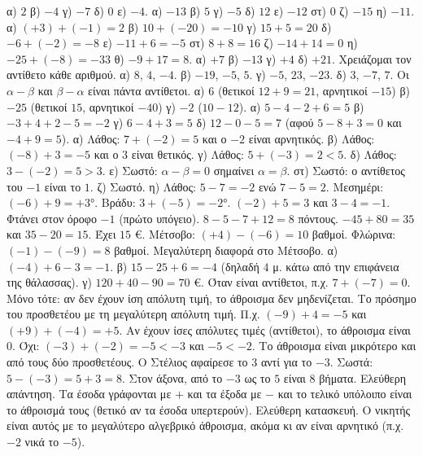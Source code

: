  α) $2$ \quad β) $-4$ \quad γ) $-7$ \quad δ) $0$ \quad ε) $-4$.
 α) $-13$ \quad β) $5$ \quad γ) $-5$ \quad δ) $12$ \quad ε) $-12$ \quad στ) $0$ \quad ζ) $-15$ \quad η) $-11$.
 α) $(+3)+(-1)=2$ \quad β) $10+(-20)=-10$ \quad γ) $15+5=20$ \quad δ) $-6+(-2)=-8$ \quad ε) $-11+6=-5$ \quad στ) $8+8=16$ \quad ζ) $-14+14=0$ \quad η) $-25+(-8)=-33$ \quad θ) $-9+17=8$.
 α) $+7$ \quad β) $-13$ \quad γ) $+4$ \quad δ) $+21$. Χρειάζομαι τον αντίθετο κάθε αριθμού.
 α) $8$, $4$, $-4$. β) $-19$, $-5$, $5$. γ) $-5$, $23$, $-23$. δ) $3$, $-7$, $7$. Οι $\alpha-\beta$ και $\beta-\alpha$ είναι πάντα αντίθετοι.
 α) $6$ (θετικοί $12+9=21$, αρνητικοί $-15$) \quad β) $-25$ (θετικοί $15$, αρνητικοί $-40$) \quad γ) $-2$ ($10-12$).
 α) $5-4-2+6=5$ \quad β) $-3+4+2-5=-2$ \quad γ) $6-4+3=5$ \quad δ) $12-0-5=7$ (αφού $5-8+3=0$ και $-4+9=5$).
 α) Λάθος: $7+(-2)=5$ και ο $-2$ είναι αρνητικός. β) Λάθος: $(-8)+3=-5$ και ο $3$ είναι θετικός. γ) Λάθος: $5+(-3)=2<5$. δ) Λάθος: $3-(-2)=5>3$. ε) Σωστό: $\alpha-\beta=0$ σημαίνει $\alpha=\beta$. στ) Σωστό: ο αντίθετος του $-1$ είναι το $1$. ζ) Σωστό. η) Λάθος: $5-7=-2$ ενώ $7-5=2$.
 Μεσημέρι: $(-6)+9=+3$°. Βράδυ: $3+(-5)=-2$°.
 $(-2)+5=3$ και $3-4=-1$. Φτάνει στον όροφο $-1$ (πρώτο υπόγειο).
 $8-5-7+12=8$ πόντους.
 $-45+80=35$ και $35-20=15$. Έχει $15$ €.
 Μέτσοβο: $(+4)-(-6)=10$ βαθμοί. Φλώρινα: $(-1)-(-9)=8$ βαθμοί. Μεγαλύτερη διαφορά στο Μέτσοβο.
 α) $(-4)+6-3=-1$. β) $15-25+6=-4$ (δηλαδή $4$ μ. κάτω από την επιφάνεια της θάλασσας). γ) $120+40-90=70$ €.
 Όταν είναι αντίθετοι, π.χ. $7+(-7)=0$. Μόνο τότε: αν δεν έχουν ίση απόλυτη τιμή, το άθροισμα δεν μηδενίζεται.
 Το πρόσημο του προσθετέου με τη μεγαλύτερη απόλυτη τιμή. Π.χ. $(-9)+4=-5$ και $(+9)+(-4)=+5$. Αν έχουν ίσες απόλυτες τιμές (αντίθετοι), το άθροισμα είναι $0$.
 Όχι: $(-3)+(-2)=-5<-3$ και $-5<-2$. Το άθροισμα είναι μικρότερο και από τους δύο προσθετέους.
 Ο Στέλιος αφαίρεσε το $3$ αντί για το $-3$. Σωστά: $5-(-3)=5+3=8$. Στον άξονα, από το $-3$ ως το $5$ είναι $8$ βήματα.
 Ελεύθερη απάντηση. Τα έσοδα γράφονται με $+$ και τα έξοδα με $-$ και το τελικό υπόλοιπο είναι το άθροισμά τους (θετικό αν τα έσοδα υπερτερούν).
 Ελεύθερη κατασκευή. Ο νικητής είναι αυτός με το μεγαλύτερο αλγεβρικό άθροισμα, ακόμα κι αν είναι αρνητικό (π.χ. $-2$ νικά το $-5$).
